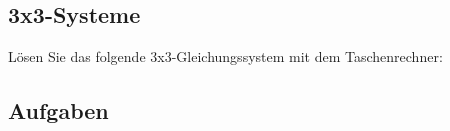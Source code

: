 \subsection{3x3-Systeme}

Lösen Sie das folgende 3x3-Gleichungssystem mit dem Taschenrechner:


\subsection*{Aufgaben}
\newpage
